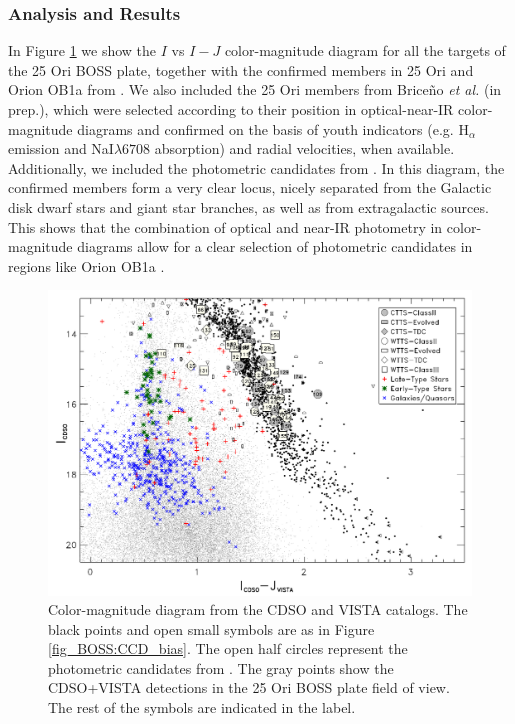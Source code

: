 \documentclass[12pt]{article}
\begin{document}
\subsubsection{Analysis and Results}
\label{sec_BOSS:results}
In Figure \ref{fig_BOSS:IvsI-J} we show the $I$ vs $I-J$ color-magnitude diagram for all the targets of the 25 Ori BOSS plate, together with the confirmed members in 25 Ori and Orion OB1a from \citet[][]{Briceno2005, Briceno2007, Downes2014, Downes2015}. We also included the 25 Ori members from Brice\~no \textit{et al.} (in prep.), which were selected according to their position in optical-near-IR color-magnitude diagrams and confirmed on the basis of youth indicators (e.g. H$_\alpha$ emission and NaI$\lambda6708$ absorption) and radial velocities, when available. Additionally, we included the photometric candidates from \citet{Hernandez2007b, Downes2014}. In this diagram, the confirmed members form a very clear locus, nicely separated from the Galactic disk dwarf stars and giant star branches, as well as from extragalactic sources. This shows that the combination of optical and near-IR photometry in color-magnitude diagrams allow for a clear selection of photometric candidates in regions like Orion OB1a \citep[e.g.,][]{Downes2014}.

\begin{figure}[ht!]
	\centering
	\includegraphics[width=1.\textwidth]{f3.pdf}
	\caption[Color-magnitude diagram of the targets in the 25 Ori BOSS plate]{Color-magnitude diagram from the CDSO and VISTA catalogs. The black points and open small symbols are as in Figure \ref{fig_BOSS:CCD_bias}. The open half circles represent the photometric candidates from \citet{Hernandez2007b}. The gray points show the CDSO+VISTA detections in the 25 Ori BOSS plate field of view. The rest of the symbols are indicated in the label.}
	\label{fig_BOSS:IvsI-J}
\end{figure}
\end{document}
